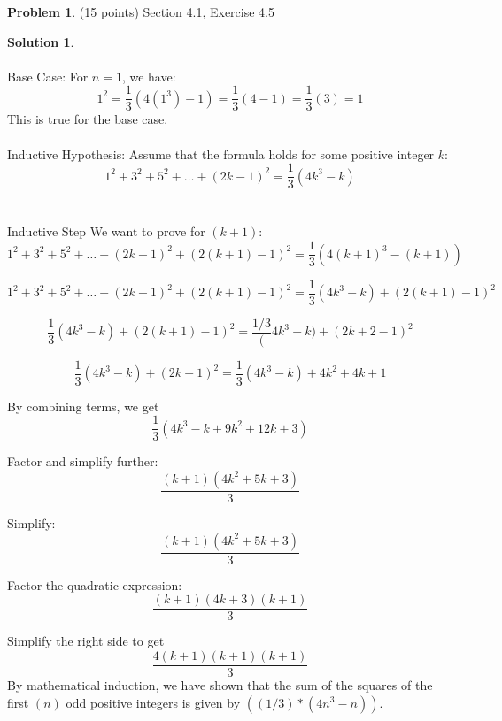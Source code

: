 \documentclass{article}
\theoremstyle{definition}
\newtheorem{problem}{Problem}
\newtheorem*{solution}{Solution}
\begin{document}
\newpage
\begin{problem} (15 points) Section 4.1, Exercise 4.5
\end{problem}
\begin{solution}
  ~\\
  ~\\
  Base Case:
  For \(n = 1\), we have:
  \[
    1^2 = \frac{1}{3}(4(1^3) - 1) = \frac{1}{3}(4 - 1) = \frac{1}{3}(3) = 1
  \]
  This is true for the base case. ~\\ ~\\ Inductive Hypothesis: Assume that the
  formula holds for some positive integer \(k\):
  \[
    1^2 + 3^2 + 5^2 + \ldots + (2k-1)^2 = \frac{1}{3}(4k^3 - k)
  \]
  ~\\
  ~\\
  Inductive Step
  We want to prove for $(k + 1)$:
  \[
    1^2 + 3^2 + 5^2 + \ldots + (2k-1)^2 + (2(k+1)-1)^2 = \frac{1}{3}(4(k+1)^3 - (k+1))
  \]

  \[
    1^2 + 3^2 + 5^2 + \ldots + (2k-1)^2 + (2(k+1)-1)^2 = \frac{1}{3}(4k^3 - k) + (2(k+1)-1)^2
  \]

  \[
    \frac{1}{3}(4k^3 - k) + (2(k+1)-1)^2 = \frac{1/3}(4k^3 - k) + (2k + 2 - 1)^2
  \]

  \[
    \frac{1}{3}(4k^3 - k) + (2k + 1)^2 = \frac{1}{3}(4k^3 - k) + 4k^2 + 4k + 1
  \]

  By combining terms, we get
  \[
    \frac{1}{3}(4k^3 - k + 9k^2 + 12k + 3)
  \]

  Factor and simplify further:
  \[
    \frac{(k+1)(4k^2 + 5k + 3)}{3}
  \]

  Simplify:
  \[
    \frac{(k+1)(4k^2 + 5k + 3)}{3}
  \]

  Factor the quadratic expression:
  \[
    \frac{(k+1)(4k+3)(k+1)}{3}
  \]

  Simplify the right side to get
  \[
    \frac{4(k+1)(k+1)(k+1)}{3}
  \]
  By mathematical induction, we have shown that the sum of the squares of the
  first $(n)$ odd positive integers is given by $((1/3)*(4n^3 - n))$.
\end{solution}
\end{document}
